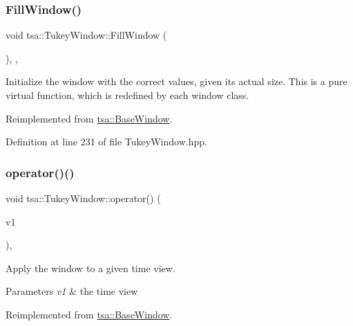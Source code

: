 \subsubsection{\texorpdfstring{Fill\+Window()}{FillWindow()}}
{\footnotesize\ttfamily void tsa\+::\+Tukey\+Window\+::\+Fill\+Window (\begin{DoxyParamCaption}{ }\end{DoxyParamCaption})\hspace{0.3cm}{\ttfamily [inline]}, {\ttfamily [private]}, {\ttfamily [virtual]}}

Initialize the window with the correct values, given its actual size. This is a pure virtual function, which is redefined by each window class. 

Reimplemented from \hyperlink{classtsa_1_1_base_window_aa74b29105d94caa521d308198e8e6643}{tsa\+::\+Base\+Window}.



Definition at line 231 of file Tukey\+Window.\+hpp.

\mbox{\label{classtsa_1_1_tukey_window_a3a68173adce5cbbebefbadb0d7084847}} 
\subsubsection{\texorpdfstring{operator()()}{operator()()}\hspace{0.1cm}{\footnotesize\ttfamily [1/3]}}
{\footnotesize\ttfamily void tsa\+::\+Tukey\+Window\+::operator() (\begin{DoxyParamCaption}\item[{\hyperlink{namespacetsa_ac599574bcc094eda25613724b8f3ca9e}{Seq\+View\+Double} \&}]{v1 }\end{DoxyParamCaption})\hspace{0.3cm}{\ttfamily [inline]}, {\ttfamily [virtual]}}

Apply the window to a given time view.


\begin{DoxyParams}{Parameters}
{\em v1} & the time view \\
\hline
\end{DoxyParams}


Reimplemented from \hyperlink{classtsa_1_1_base_window_a05d9edb95dc01840a1b2df78dfa3a8c1}{tsa\+::\+Base\+Window}.



